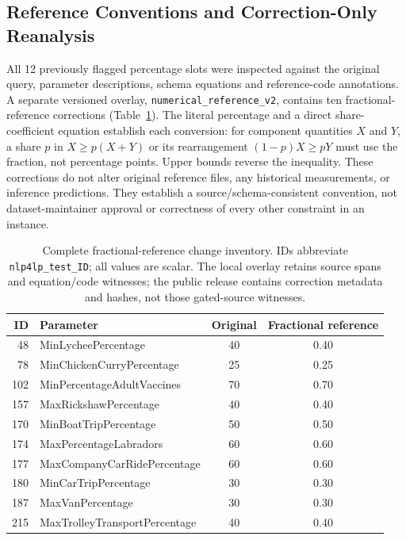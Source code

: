 \subsection{Reference Conventions and Correction-Only Reanalysis}
\label{app:reference-conventions}

All 12 previously flagged percentage slots were inspected against the
original query, parameter descriptions, schema equations and reference-code
annotations. A separate versioned overlay, \texttt{numerical\_reference\_v2},
contains ten fractional-reference corrections (Table~\ref{tab:reference-overlay}).
The literal percentage and a direct share-coefficient equation establish
each conversion: for component quantities $X$ and $Y$, a share $p$ in $X\geq p(X+Y)$ or its rearrangement
$(1-p)X\geq pY$ must use the fraction, not percentage points. Upper bounds
reverse the inequality. These corrections do not alter original reference
files, any historical measurements, or inference predictions. They establish
a source/schema-consistent convention, not dataset-maintainer approval or
correctness of every other constraint in an instance.

\begin{table}[htbp]
\centering\small
\caption{Complete fractional-reference change inventory. IDs abbreviate
\texttt{nlp4lp\_test\_ID}; all values are scalar. The local overlay retains source spans and equation/code witnesses; the public release contains correction metadata and hashes, not those gated-source witnesses.}
\label{tab:reference-overlay}
\begin{tabular}{@{}rlcc@{}}
\toprule
ID & Parameter & Original & Fractional reference\\
\midrule
48 & MinLycheePercentage & 40 & 0.40\\
78 & MinChickenCurryPercentage & 25 & 0.25\\
102 & MinPercentageAdultVaccines & 70 & 0.70\\
157 & MaxRickshawPercentage & 40 & 0.40\\
170 & MinBoatTripPercentage & 50 & 0.50\\
174 & MaxPercentageLabradors & 60 & 0.60\\
177 & MaxCompanyCarRidePercentage & 60 & 0.60\\
180 & MinCarTripPercentage & 30 & 0.30\\
187 & MaxVanPercentage & 30 & 0.30\\
215 & MaxTrolleyTransportPercentage & 40 & 0.40\\
\bottomrule
\end{tabular}
\end{table}

